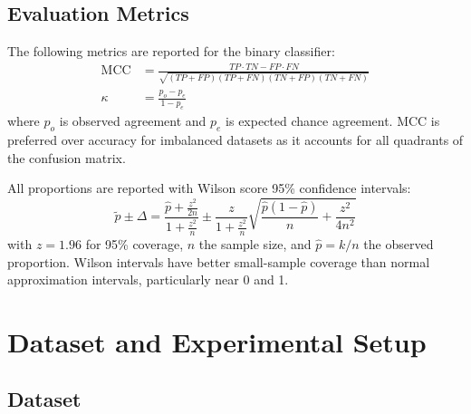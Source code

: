 \documentclass[twocolumn, 10pt, letterpaper]{article}
\begin{document}
\subsection{Evaluation Metrics}

The following metrics are reported for the binary classifier:
\begin{align}
    \text{MCC} &= \frac{TP \cdot TN - FP \cdot FN}{\sqrt{(TP{+}FP)(TP{+}FN)(TN{+}FP)(TN{+}FN)}} \\[4pt]
    \kappa &= \frac{p_o - p_e}{1 - p_e}
\end{align}
where $p_o$ is observed agreement and $p_e$ is expected chance agreement.
MCC is preferred over accuracy for imbalanced datasets as it accounts for all
quadrants of the confusion matrix.

All proportions are reported with Wilson score 95\% confidence intervals:
\begin{equation}
    \tilde{p} \pm \Delta = \frac{\hat{p} + \frac{z^2}{2n}}{1 + \frac{z^2}{n}}
    \pm \frac{z}{1 + \frac{z^2}{n}}
    \sqrt{\frac{\hat{p}(1-\hat{p})}{n} + \frac{z^2}{4n^2}}
\end{equation}
with $z = 1.96$ for 95\% coverage, $n$ the sample size, and $\hat{p} = k/n$
the observed proportion.
Wilson intervals have better small-sample coverage than normal approximation
intervals, particularly near 0 and 1.

\section{Dataset and Experimental Setup}
\label{sec:setup}

\subsection{Dataset}
\end{document}
